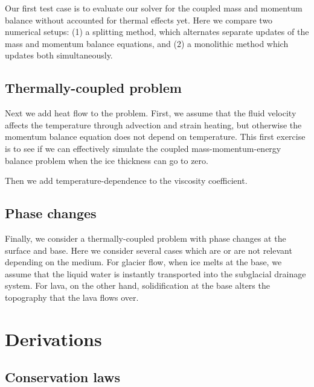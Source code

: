 \documentclass{article}
\theoremstyle{definition}
\theoremstyle{plain}
\begin{document}
Our first test case is to evaluate our solver for the coupled mass and momentum balance without accounted for thermal effects yet.
Here we compare two numerical setups: (1) a splitting method, which alternates separate updates of the mass and momentum balance equations, and (2) a monolithic method which updates both simultaneously.

\subsection{Thermally-coupled problem}

Next we add heat flow to the problem.
First, we assume that the fluid velocity affects the temperature through advection and strain heating, but otherwise the momentum balance equation does not depend on temperature.
This first exercise is to see if we can effectively simulate the coupled mass-momentum-energy balance problem when the ice thickness can go to zero.

Then we add temperature-dependence to the viscosity coefficient.

\subsection{Phase changes}

Finally, we consider a thermally-coupled problem with phase changes at the surface and base.
Here we consider several cases which are or are not relevant depending on the medium.
For glacier flow, when ice melts at the base, we assume that the liquid water is instantly transported into the subglacial drainage system.
For lava, on the other hand, solidification at the base alters the topography that the lava flows over.


\pagebreak

\appendix
\section{Derivations}

\subsection{Conservation laws}
\end{document}
